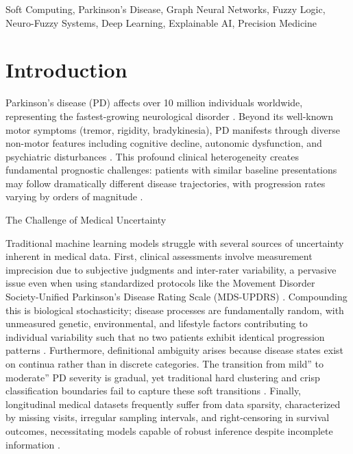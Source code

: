 \documentclass[conference]{IEEEtran}
\begin{document}
\begin{IEEEkeywords}
Soft Computing, Parkinson's Disease, Graph Neural Networks, Fuzzy Logic, Neuro-Fuzzy Systems, Deep Learning, Explainable AI, Precision Medicine
\end{IEEEkeywords}

\section{Introduction}

Parkinson's disease (PD) affects over 10 million individuals worldwide, representing the fastest-growing neurological disorder \cite{dorsey2018parkinsons}. Beyond its well-known motor symptoms (tremor, rigidity, bradykinesia), PD manifests through diverse non-motor features including cognitive decline, autonomic dysfunction, and psychiatric disturbances \cite{schapira2017nonmotor}. This profound clinical heterogeneity creates fundamental prognostic challenges: patients with similar baseline presentations may follow dramatically different disease trajectories, with progression rates varying by orders of magnitude \cite{fereshtehnejad2017clinical}.

The Challenge of Medical Uncertainty

Traditional machine learning models struggle with several sources of uncertainty inherent in medical data. First, clinical assessments involve measurement imprecision due to subjective judgments and inter-rater variability, a pervasive issue even when using standardized protocols like the Movement Disorder Society-Unified Parkinson's Disease Rating Scale (MDS-UPDRS) \cite{goetz2008movement}. Compounding this is biological stochasticity; disease processes are fundamentally random, with unmeasured genetic, environmental, and lifestyle factors contributing to individual variability such that no two patients exhibit identical progression patterns \cite{poewe2017parkinson}. Furthermore, definitional ambiguity arises because disease states exist on continua rather than in discrete categories. The transition from mild'' to moderate'' PD severity is gradual, yet traditional hard clustering and crisp classification boundaries fail to capture these soft transitions \cite{kuncheva2010fuzzy}. Finally, longitudinal medical datasets frequently suffer from data sparsity, characterized by missing visits, irregular sampling intervals, and right-censoring in survival outcomes, necessitating models capable of robust inference despite incomplete information \cite{marek2011ppmi}.
\end{document}
